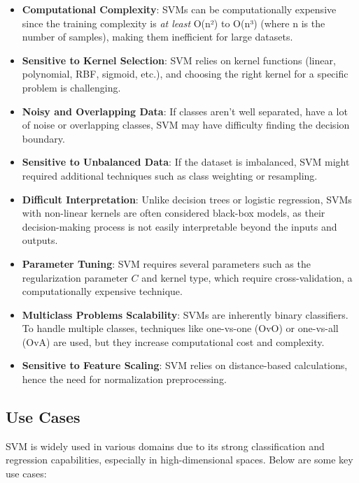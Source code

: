 \begin{itemize}
    \item \textbf{Computational Complexity}: SVMs can be computationally expensive since the training complexity is \textit{at least} O(n²) to O(n³) (where n is the number of samples), making them inefficient for large datasets.
    \item \textbf{Sensitive to Kernel Selection}: SVM relies on kernel functions (linear, polynomial, RBF, sigmoid, etc.), and choosing the right kernel for a specific problem is challenging.
    \item \textbf{Noisy and Overlapping Data}: If classes aren't well separated, have a lot of noise or overlapping classes, SVM may have difficulty finding the decision boundary.
    \item \textbf{Sensitive to Unbalanced Data}: If the dataset is imbalanced, SVM might required additional techniques such as class weighting or resampling.
    \item \textbf{Difficult Interpretation}: Unlike decision trees or logistic regression, SVMs with non-linear kernels are often considered black-box models, as their decision-making process is not easily interpretable beyond the inputs and outputs.
    \item \textbf{Parameter Tuning}: SVM requires several parameters such as the regularization parameter $C$ and kernel type, which require cross-validation, a computationally expensive technique.
    \item \textbf{Multiclass Problems Scalability}: SVMs are inherently binary classifiers.
    To handle multiple classes, techniques like one-vs-one (OvO) or one-vs-all (OvA) are used, but they increase computational cost and complexity.
    \item \textbf{Sensitive to Feature Scaling}: SVM relies on distance-based calculations, hence the need for normalization preprocessing.
\end{itemize}

\subsection{Use Cases}
\label{subsec:use-cases}

SVM is widely used in various domains due to its strong classification and regression capabilities, especially in high-dimensional spaces.
Below are some key use cases:

